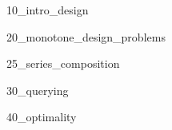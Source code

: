 
\label{chap:application-design-problems}

{10_intro_design}


{20_monotone_design_problems}

{25_series_composition}

{30_querying}

{40_optimality}



